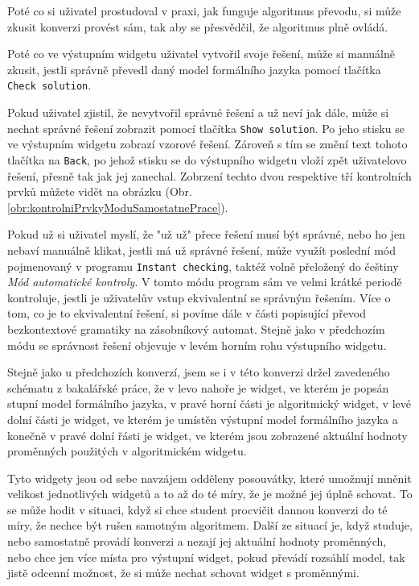 Poté co si uživatel prostudoval v praxi, jak funguje algoritmus převodu, si může zkusit konverzi provést sám, tak aby se přesvědčil, že algoritmus plně ovládá. 

Poté co ve výstupním widgetu uživatel vytvořil svoje řešení, může si manuálně zkusit, jestli správně převedl daný model formálního jazyka pomocí tlačítka \texttt{Check solution}. 

Pokud uživatel zjistil, že nevytvořil správné řešení a už neví jak dále, může si nechat správné řešení zobrazit pomocí tlačítka \texttt{Show solution}. Po jeho stisku se ve výstupním widgetu zobrazí vzorové řešení. Zároveň s tím se změní text tohoto tlačítka na \texttt{Back}, po jehož stisku se do výstupního widgetu vloží zpět uživatelovo řešení, přesně tak jak jej zanechal. Zobrzení techto dvou respektive tří kontrolních prvků můžete vidět na obrázku (Obr. \ref{obr:kontrolniPrvkyModuSamostatnePrace}).



Pokud už si uživatel myslí, že "už už" přece řešení musí být správné, nebo ho jen nebaví manuálně klikat, jestli má už správné řešení, může využít poslední mód pojmenovaný v programu \texttt{Instant checking}, taktéž volně přeložený do češtiny \textit{Mód automatické kontroly}. V tomto módu program sám ve velmi krátké periodě kontroluje, jestli je uživatelův vstup ekvivalentní se správným řešením. Více o tom, co je to ekvivalentní řešení, si povíme dále v části popisující převod bezkontextové gramatiky na zásobníkový automat. Stejně jako v předchozím módu se správnost řešení objevuje v levém horním rohu výstupního widgetu. 


Stejně jako u předchozích konverzí, jsem se i v této konverzi držel zavedeného schématu z bakalářské práce, že v levo nahoře je widget, ve kterém je popsán stupní model formálního jazyka, v pravé horní části je algoritmický widget, v levé dolní části je widget, ve kterém je umístěn výstupní model formálního jazyka a konečně v pravé dolní řásti je widget, ve kterém jsou zobrazené aktuální hodnoty proměnných použitých v algoritmickém widgetu. 

Tyto widgety jsou od sebe navzájem odděleny posouvátky, které umožnují mněnit velikost jednotlivých widgetů a to až do té míry, že je možné jej úplně schovat. To se může hodit v situaci, když si chce student procvičit dannou konverzi do té míry, že nechce být rušen samotným algoritmem. Další ze situací je, když studuje, nebo samostatně provádí konverzi a nezají jej aktuální hodnoty proměnných, nebo chce jen více místa pro výstupní widget, pokud převádí rozsáhlí model, tak jistě odcenní možnost, že si může nechat schovat widget s proměnnými.

